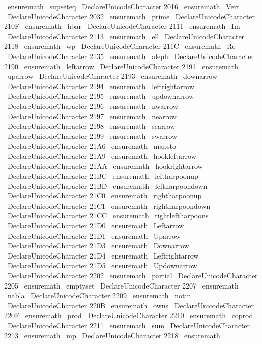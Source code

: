 {{{{{{\
ensuremath
\
supseteq
}
%
%
\
DeclareUnicodeCharacter
{
2016
}
{
\
ensuremath
\
Vert
}
%
\
DeclareUnicodeCharacter
{
2032
}
{
\
ensuremath
\
prime
}
%
\
DeclareUnicodeCharacter
{
210F
}
{
\
ensuremath
\
hbar
}
%
\
DeclareUnicodeCharacter
{
2111
}
{
\
ensuremath
\
Im
}
%
\
DeclareUnicodeCharacter
{
2113
}
{
\
ensuremath
\
ell
}
%
\
DeclareUnicodeCharacter
{
2118
}
{
\
ensuremath
\
wp
}
%
\
DeclareUnicodeCharacter
{
211C
}
{
\
ensuremath
\
Re
}
%
\
DeclareUnicodeCharacter
{
2135
}
{
\
ensuremath
\
aleph
}
%
\
DeclareUnicodeCharacter
{
2190
}
{
\
ensuremath
\
leftarrow
}
%
\
DeclareUnicodeCharacter
{
2191
}
{
\
ensuremath
\
uparrow
}
%
\
DeclareUnicodeCharacter
{
2193
}
{
\
ensuremath
\
downarrow
}
%
\
DeclareUnicodeCharacter
{
2194
}
{
\
ensuremath
\
leftrightarrow
}
%
\
DeclareUnicodeCharacter
{
2195
}
{
\
ensuremath
\
updownarrow
}
%
\
DeclareUnicodeCharacter
{
2196
}
{
\
ensuremath
\
nwarrow
}
%
\
DeclareUnicodeCharacter
{
2197
}
{
\
ensuremath
\
nearrow
}
%
\
DeclareUnicodeCharacter
{
2198
}
{
\
ensuremath
\
searrow
}
%
\
DeclareUnicodeCharacter
{
2199
}
{
\
ensuremath
\
swarrow
}
%
\
DeclareUnicodeCharacter
{
21A6
}
{
\
ensuremath
\
mapsto
}
%
\
DeclareUnicodeCharacter
{
21A9
}
{
\
ensuremath
\
hookleftarrow
}
%
\
DeclareUnicodeCharacter
{
21AA
}
{
\
ensuremath
\
hookrightarrow
}
%
\
DeclareUnicodeCharacter
{
21BC
}
{
\
ensuremath
\
leftharpoonup
}
%
\
DeclareUnicodeCharacter
{
21BD
}
{
\
ensuremath
\
leftharpoondown
}
%
\
DeclareUnicodeCharacter
{
21C0
}
{
\
ensuremath
\
rightharpoonup
}
%
\
DeclareUnicodeCharacter
{
21C1
}
{
\
ensuremath
\
rightharpoondown
}
%
\
DeclareUnicodeCharacter
{
21CC
}
{
\
ensuremath
\
rightleftharpoons
}
%
\
DeclareUnicodeCharacter
{
21D0
}
{
\
ensuremath
\
Leftarrow
}
%
\
DeclareUnicodeCharacter
{
21D1
}
{
\
ensuremath
\
Uparrow
}
%
\
DeclareUnicodeCharacter
{
21D3
}
{
\
ensuremath
\
Downarrow
}
%
\
DeclareUnicodeCharacter
{
21D4
}
{
\
ensuremath
\
Leftrightarrow
}
%
\
DeclareUnicodeCharacter
{
21D5
}
{
\
ensuremath
\
Updownarrow
}
%
\
DeclareUnicodeCharacter
{
2202
}
{
\
ensuremath
\
partial
}
%
\
DeclareUnicodeCharacter
{
2205
}
{
\
ensuremath
\
emptyset
}
%
\
DeclareUnicodeCharacter
{
2207
}
{
\
ensuremath
\
nabla
}
%
\
DeclareUnicodeCharacter
{
2209
}
{
\
ensuremath
\
notin
}
%
\
DeclareUnicodeCharacter
{
220B
}
{
\
ensuremath
\
owns
}
%
\
DeclareUnicodeCharacter
{
220F
}
{
\
ensuremath
\
prod
}
%
\
DeclareUnicodeCharacter
{
2210
}
{
\
ensuremath
\
coprod
}
%
\
DeclareUnicodeCharacter
{
2211
}
{
\
ensuremath
\
sum
}
%
\
DeclareUnicodeCharacter
{
2213
}
{
\
ensuremath
\
mp
}
%
\
DeclareUnicodeCharacter
{
2218
}
{
\
ensuremath
}}}}}}
